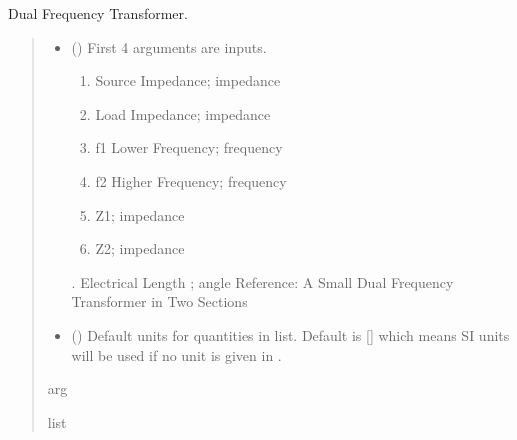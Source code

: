 \documentclass[letterpaper,10pt,english]{sphinxmanual}
\begin{document}

\begin{fulllineitems}
\label{\detokenize{components:components.DualFrequencyTransformer}}
\pysigstartsignatures
{}
\pysigstopsignatures
\sphinxAtStartPar
Dual Frequency Transformer.
\begin{quote}\begin{description}
\begin{itemize}
\item {}
\sphinxAtStartPar
{} () \textendash{}
\sphinxAtStartPar
First 4 arguments are inputs.
\begin{enumerate}
%
\item {}
\sphinxAtStartPar
Source Impedance; impedance

\item {}
\sphinxAtStartPar
Load Impedance; impedance

\item {}
\sphinxAtStartPar
f1 Lower Frequency; frequency

\item {}
\sphinxAtStartPar
f2 Higher Frequency; frequency

\item {}
\sphinxAtStartPar
Z1; impedance

\item {}
\sphinxAtStartPar
Z2; impedance

\end{enumerate}

. Electrical Length ; angle
Reference:  A Small Dual Frequency Transformer in Two Sections


\item {}
\sphinxAtStartPar
{} (\sphinxstyleliteralemphasis{\sphinxupquote{, }}) \textendash{} Default units for quantities in  list. Default is {[}{]} which means SI units will be used if no unit is given in .

\end{itemize}

\sphinxAtStartPar
arg

\sphinxAtStartPar
list

\end{description}\end{quote}

\end{fulllineitems}
\end{document}
